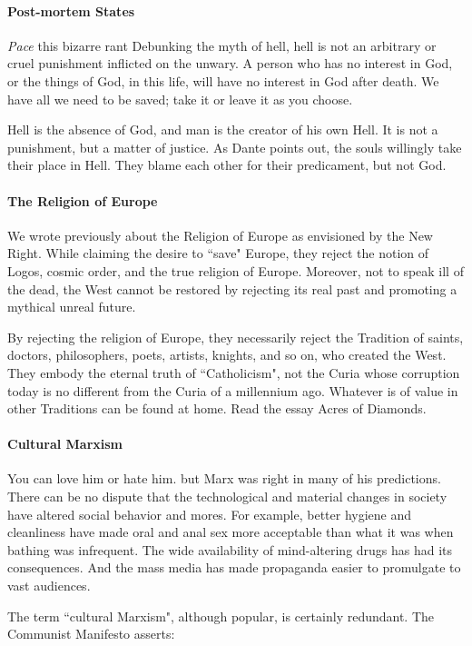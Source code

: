 \paragraph{Post-mortem States}
\emph{Pace} this bizarre rant Debunking the myth of hell, hell is not an arbitrary or cruel punishment inflicted on the unwary. A person who has no interest in God, or the things of God, in this life, will have no interest in God after death. We have all we need to be saved; take it or leave it as you choose.

Hell is the absence of God, and man is the creator of his own Hell. It is not a punishment, but a matter of justice. As Dante points out, the souls willingly take their place in Hell. They blame each other for their predicament, but not God.

\paragraph{The Religion of Europe}
We wrote previously about the Religion of Europe as envisioned by the New Right. While claiming the desire to ``save" Europe, they reject the notion of Logos, cosmic order, and the true religion of Europe. Moreover, not to speak ill of the dead, the West cannot be restored by rejecting its real past and promoting a mythical unreal future.

By rejecting the religion of Europe, they necessarily reject the Tradition of saints, doctors, philosophers, poets, artists, knights, and so on, who created the West. They embody the eternal truth of ``Catholicism", not the Curia whose corruption today is no different from the Curia of a millennium ago. Whatever is of value in other Traditions can be found at home. Read the essay Acres of Diamonds.

\paragraph{Cultural Marxism}
You can love him or hate him. but Marx was right in many of his predictions. There can be no dispute that the technological and material changes in society have altered social behavior and mores. For example, better hygiene and cleanliness have made oral and anal sex more acceptable than what it was when bathing was infrequent. The wide availability of mind-altering drugs has had its consequences. And the mass media has made propaganda easier to promulgate to vast audiences.

The term ``cultural Marxism", although popular, is certainly redundant. The Communist Manifesto asserts:


